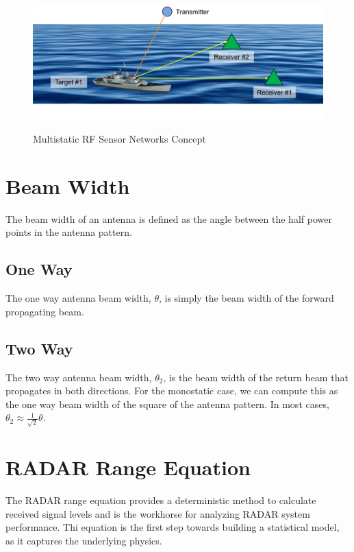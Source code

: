\begin{figure}[H]
  \begin{center}
\includegraphics[width=5in]{../media/multistatic/ms_rf_concept.png}
  \end{center}
  \renewcommand{\baselinestretch}{1} \small\normalsize
  \begin{quote}
    \caption[Multistatic RF Sensor Networks Concept]{Multistatic RF Sensor Networks Concept\label{ms_fig:1}}
  \end{quote}
\end{figure}
\renewcommand{\baselinestretch}{2} \small\normalsize

\section{Beam Width}
The beam width of an antenna is defined as the angle between the half power points in the antenna pattern.

\subsection{One Way}
The one way antenna beam width, $\theta$, is simply the beam width of the forward propagating beam.

\subsection{Two Way}
The two way antenna beam width, $\theta_2$, is the beam width of the return beam that propagates in both directions. For the monostatic case, we can compute this as the one way beam width of the square of the antenna pattern. In most cases, $\theta_2 \approx \frac{1}{\sqrt{2}}\theta$.

\section{RADAR Range Equation} 
The RADAR range equation provides a deterministic method to calculate received signal levels and is the workhorse for analyzing RADAR system performance. Thi equation is the first step towards building a statistical model, as it captures the underlying physics.

